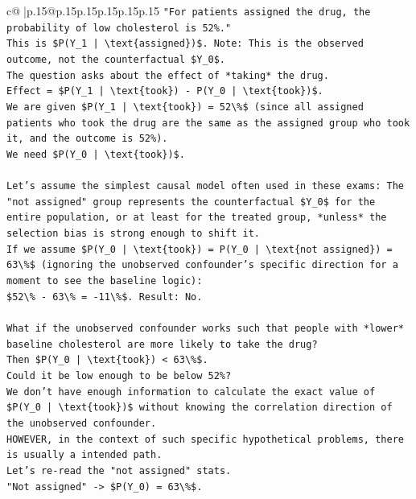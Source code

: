 \documentclass{article}
\begin{document}
{\begin{supertabular}{c@{$\;$}|p{.15\linewidth}@{}p{.15\linewidth}p{.15\linewidth}p{.15\linewidth}p{.15\linewidth}p{.15\linewidth}}
{{{\texttt{"For patients assigned the drug, the probability of low cholesterol is 52\%."} \\
\texttt{This is \$P(Y\_1 | \textbackslash{}text\{assigned\})\$. Note: This is the observed outcome, not the counterfactual \$Y\_0\$.} \\
\texttt{The question asks about the effect of *taking* the drug.} \\
\texttt{Effect = \$P(Y\_1 | \textbackslash{}text\{took\}) {-} P(Y\_0 | \textbackslash{}text\{took\})\$.} \\
\texttt{We are given \$P(Y\_1 | \textbackslash{}text\{took\}) = 52\textbackslash{}\%\$ (since all assigned patients who took the drug are the same as the assigned group who took it, and the outcome is 52\%).} \\
\texttt{We need \$P(Y\_0 | \textbackslash{}text\{took\})\$.} \\
\\ 
\texttt{Let's assume the simplest causal model often used in these exams: The "not assigned" group represents the counterfactual \$Y\_0\$ for the entire population, or at least for the treated group, *unless* the selection bias is strong enough to shift it.} \\
\texttt{If we assume \$P(Y\_0 | \textbackslash{}text\{took\}) = P(Y\_0 | \textbackslash{}text\{not assigned\}) = 63\textbackslash{}\%\$ (ignoring the unobserved confounder's specific direction for a moment to see the baseline logic):} \\
\texttt{\$52\textbackslash{}\% {-} 63\textbackslash{}\% = {-}11\textbackslash{}\%\$. Result: No.} \\
\\ 
\texttt{What if the unobserved confounder works such that people with *lower* baseline cholesterol are more likely to take the drug?} \\
\texttt{Then \$P(Y\_0 | \textbackslash{}text\{took\}) < 63\textbackslash{}\%\$.} \\
\texttt{Could it be low enough to be below 52\%?} \\
\texttt{We don't have enough information to calculate the exact value of \$P(Y\_0 | \textbackslash{}text\{took\})\$ without knowing the correlation direction of the unobserved confounder.} \\
\texttt{HOWEVER, in the context of such specific hypothetical problems, there is usually a intended path.} \\
\texttt{Let's re{-}read the "not assigned" stats.} \\
\texttt{"Not assigned" {-}> \$P(Y\_0) = 63\textbackslash{}\%\$.} \\
}}}
\end{supertabular}}
\end{document}
